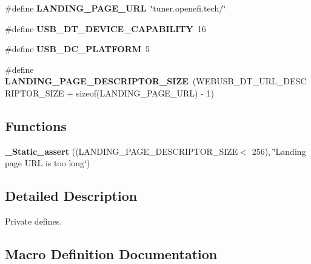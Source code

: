 \begin{DoxyCompactItemize}
\item 
\mbox{\label{group__USBD__DESC__Private__Defines_ga48d99bb33605116f4971c2f148b4c304}} 
\#define {\bfseries L\+A\+N\+D\+I\+N\+G\+\_\+\+P\+A\+G\+E\+\_\+\+U\+RL}~\char`\"{}tuner.\+openefi.\+tech/\char`\"{}
\item 
\mbox{\label{group__USBD__DESC__Private__Defines_gae7f500790475fbda52712ebd4e6c1524}} 
\#define {\bfseries U\+S\+B\+\_\+\+D\+T\+\_\+\+D\+E\+V\+I\+C\+E\+\_\+\+C\+A\+P\+A\+B\+I\+L\+I\+TY}~16
\item 
\mbox{\label{group__USBD__DESC__Private__Defines_ga2bca652ad7ac5a5ac965963d5037b0b3}} 
\#define {\bfseries U\+S\+B\+\_\+\+D\+C\+\_\+\+P\+L\+A\+T\+F\+O\+RM}~5
\item 
\mbox{\label{group__USBD__DESC__Private__Defines_ga8c8ac3888448b0213e7c92be3e4f4fba}} 
\#define {\bfseries L\+A\+N\+D\+I\+N\+G\+\_\+\+P\+A\+G\+E\+\_\+\+D\+E\+S\+C\+R\+I\+P\+T\+O\+R\+\_\+\+S\+I\+ZE}~(W\+E\+B\+U\+S\+B\+\_\+\+D\+T\+\_\+\+U\+R\+L\+\_\+\+D\+E\+S\+C\+R\+I\+P\+T\+O\+R\+\_\+\+S\+I\+ZE + sizeof(L\+A\+N\+D\+I\+N\+G\+\_\+\+P\+A\+G\+E\+\_\+\+U\+RL) -\/ 1)
\end{DoxyCompactItemize}
\subsection*{Functions}
\begin{DoxyCompactItemize}
\item 
\mbox{\label{group__USBD__DESC__Private__Defines_ga65272ce36accff718bb8dea97f69f46c}} 
{\bfseries \+\_\+\+Static\+\_\+assert} ((L\+A\+N\+D\+I\+N\+G\+\_\+\+P\+A\+G\+E\+\_\+\+D\+E\+S\+C\+R\+I\+P\+T\+O\+R\+\_\+\+S\+I\+ZE$<$ 256), \char`\"{}Landing page U\+RL is too long\char`\"{})
\end{DoxyCompactItemize}


\subsection{Detailed Description}
Private defines. 



\subsection{Macro Definition Documentation}
\mbox{\label{group__USBD__DESC__Private__Defines_ga1f629ef661d7de6ab22e6c4817fa28f2}} 
